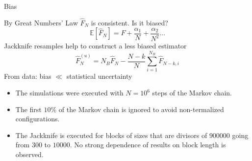\documentclass[12pt,handout]{beamer}
\begin{document}
\begin{frame}{Bias}
\begin{center}
By Great Numbers' Law $\hat{F}_N$ is consistent. Is it biased?
\[
	\mathbb E \left[\hat{F}_N\right] = F + \frac{\alpha_1}{N} + \frac{\alpha _2}{N^2} \ldots 
\]
Jackknife resamples help to construct a less biased estimator
\[
	\hat{F}^{\left(u\right)} _N = N_B\hat{F}_N - \frac{N-k}{N} \sum_{i = 1} ^ {N_B} \hat{F}_{N-k, i}
\]
From data: bias $\ll$ statistical uncertainty

\end{center}
\end{frame}


\begin{frame}
\begin{center}
\begin{itemize}
\item The simulations were executed with $N = 10^6$ steps of the Markov chain.\\
\vspace{10pt}
\item The first $10\%$ of the Markov chain is ignored to avoid non-termalized configurations.\\
\vspace{10pt}
\item The Jackknife is executed for blocks of sizes that are divisors of $900000$ going from $300$ to $10000$. No strong dependence of results on block length is observed.\\
\end{itemize}
\end{center}
\end{frame}
\end{document}
